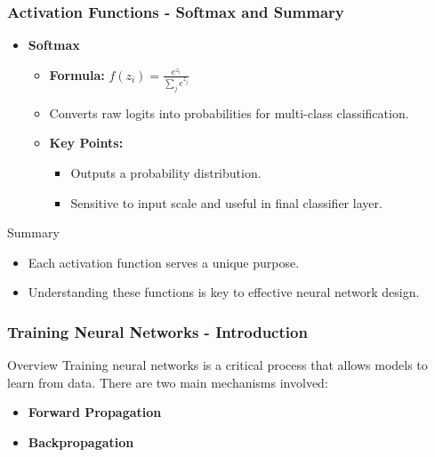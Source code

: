 \documentclass[aspectratio=169]{beamer}
\begin{document}
\begin{frame}[fragile]
    \frametitle{Activation Functions - Softmax and Summary}
    \begin{itemize}
        \item \textbf{Softmax}
        \begin{itemize}
            \item \textbf{Formula:} \( f(z_i) = \frac{e^{z_i}}{\sum_{j} e^{z_j}} \)
            \item Converts raw logits into probabilities for multi-class classification.
            \item \textbf{Key Points:}
            \begin{itemize}
                \item Outputs a probability distribution.
                \item Sensitive to input scale and useful in final classifier layer.
            \end{itemize}
        \end{itemize}
    \end{itemize}
    \begin{block}{Summary}
        \begin{itemize}
            \item Each activation function serves a unique purpose.
            \item Understanding these functions is key to effective neural network design.
        \end{itemize}
    \end{block}
\end{frame}

\begin{frame}[fragile]
    \frametitle{Training Neural Networks - Introduction}
    \begin{block}{Overview}
        Training neural networks is a critical process that allows models to learn from data. 
        There are two main mechanisms involved:
        \begin{itemize}
            \item \textbf{Forward Propagation}
            \item \textbf{Backpropagation}
        \end{itemize}
    \end{block}
\end{frame}
\end{document}

